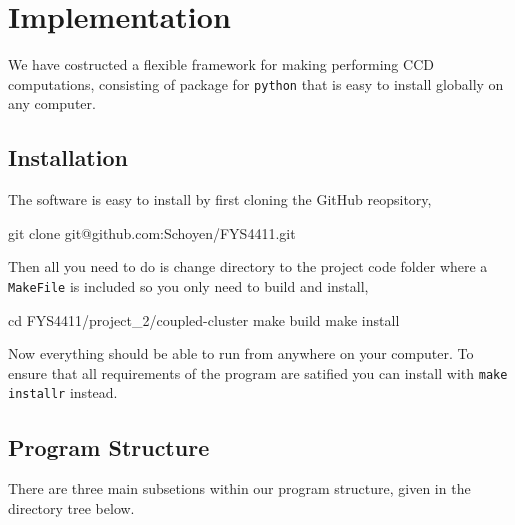 \documentclass[
    a4paper, aps, twocolumn, floatfix, superscriptaddress,
    nofootinbib]{revtex4-1}
\newcommand{\1}{\mathds{1}}
\begin{document}
\section{Implementation}
    We have costructed a flexible framework for making performing CCD
    computations, consisting of package for \lstinline{python} that is easy
    to install globally on any computer.

    \subsection{Installation}
        The software is easy to install by first cloning the GitHub reopsitory,
        \begin{bash}
            git clone git@github.com:Schoyen/FYS4411.git
        \end{bash}
        Then all you need to do is change directory to the project code folder
        where a \lstinline{MakeFile} is included so you only need to build and
        install,
        \begin{bash}
            cd FYS4411/project_2/coupled-cluster
            make build
            make install
        \end{bash}
        Now everything should be able to run from anywhere on your computer.
        To ensure that all requirements of the program are satified you can
        install with \lstinline{make installr} instead.

    \subsection{Program Structure}
        There are three main subsetions within our program structure,
        given in the directory tree below.

\end{document}
